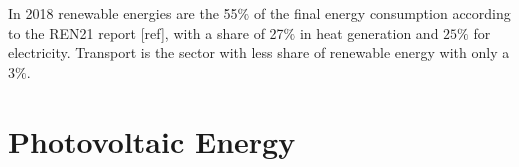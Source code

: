 
In 2018 renewable energies are the 55$\%$ of the final energy consumption according to the REN21 report [ref], with a share of 27$\%$ in heat generation and $25\%$ for electricity. Transport is the sector with less share of renewable energy with only a $3\%$.



\section{Photovoltaic Energy}






